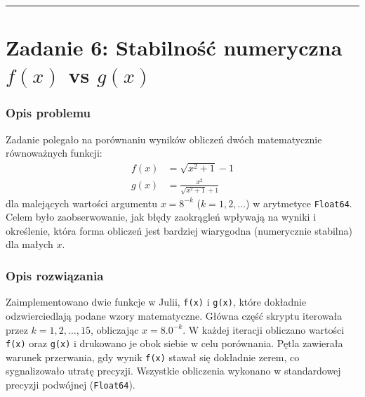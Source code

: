 \documentclass[11pt, a4paper]{article}
\newcommand{\taskseparator}{\leavevmode\leaders\hrule height 0.5pt\hfill\kern0pt}
\begin{document}
\taskseparator

\section{Zadanie 6: Stabilność numeryczna \texorpdfstring{$f(x)$ vs $g(x)$}{f(x) vs g(x)}}

\subsubsection{Opis problemu}
Zadanie polegało na porównaniu wyników obliczeń dwóch matematycznie równoważnych funkcji:
\begin{align*}
    f(x) &= \sqrt{x^2 + 1} - 1 \\
    g(x) &= \frac{x^2}{\sqrt{x^2 + 1} + 1}
\end{align*}
dla malejących wartości argumentu $x = 8^{-k}$ ($k=1, 2, \dots$) w arytmetyce \texttt{Float64}. Celem było zaobserwowanie, jak błędy zaokrągleń wpływają na wyniki i określenie, która forma obliczeń jest bardziej wiarygodna (numerycznie stabilna) dla małych $x$.

\subsubsection{Opis rozwiązania}
Zaimplementowano dwie funkcje w Julii, \texttt{f(x)} i \texttt{g(x)}, które dokładnie odzwierciedlają podane wzory matematyczne. Główna część skryptu iterowała przez $k = 1, 2, \dots, 15$, obliczając $x = 8.0^{-k}$. W każdej iteracji obliczano wartości \texttt{f(x)} oraz \texttt{g(x)} i drukowano je obok siebie w celu porównania. Pętla zawierała warunek przerwania, gdy wynik \texttt{f(x)} stawał się dokładnie zerem, co sygnalizowało utratę precyzji. Wszystkie obliczenia wykonano w standardowej precyzji podwójnej (\texttt{Float64}).
\end{document}
